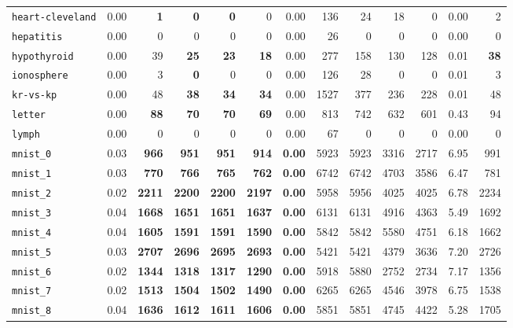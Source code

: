 \begin{tabular}{lrrrrrrrrrrrr}
\texttt{heart-cleveland} & 0.00 & \textbf{1} & \textbf{0} & \textbf{0} & 0 & 0.00 & 136 & 24 & 18 & 0 & 0.00 & 2\\
\texttt{hepatitis} & 0.00 & 0 & 0 & 0 & 0 & 0.00 & 26 & 0 & 0 & 0 & 0.00 & 0\\
\texttt{hypothyroid} & 0.00 & 39 & \textbf{25} & \textbf{23} & \textbf{18} & 0.00 & 277 & 158 & 130 & 128 & 0.01 & \textbf{38}\\
\texttt{ionosphere} & 0.00 & 3 & \textbf{0} & 0 & 0 & 0.00 & 126 & 28 & 0 & 0 & 0.01 & 3\\
\texttt{kr-vs-kp} & 0.00 & 48 & \textbf{38} & \textbf{34} & \textbf{34} & 0.00 & 1527 & 377 & 236 & 228 & 0.01 & 48\\
\texttt{letter} & 0.00 & \textbf{88} & \textbf{70} & \textbf{70} & \textbf{69} & 0.00 & 813 & 742 & 632 & 601 & 0.43 & 94\\
\texttt{lymph} & 0.00 & 0 & 0 & 0 & 0 & 0.00 & 67 & 0 & 0 & 0 & 0.00 & 0\\
\texttt{mnist\_0} & 0.03 & \textbf{966} & \textbf{951} & \textbf{951} & \textbf{914} & \textbf{0.00} & 5923 & 5923 & 3316 & 2717 & 6.95 & 991\\
\texttt{mnist\_1} & 0.03 & \textbf{770} & \textbf{766} & \textbf{765} & \textbf{762} & \textbf{0.00} & 6742 & 6742 & 4703 & 3586 & 6.47 & 781\\
\texttt{mnist\_2} & 0.02 & \textbf{2211} & \textbf{2200} & \textbf{2200} & \textbf{2197} & \textbf{0.00} & 5958 & 5956 & 4025 & 4025 & 6.78 & 2234\\
\texttt{mnist\_3} & 0.04 & \textbf{1668} & \textbf{1651} & \textbf{1651} & \textbf{1637} & \textbf{0.00} & 6131 & 6131 & 4916 & 4363 & 5.49 & 1692\\
\texttt{mnist\_4} & 0.04 & \textbf{1605} & \textbf{1591} & \textbf{1591} & \textbf{1590} & \textbf{0.00} & 5842 & 5842 & 5580 & 4751 & 6.18 & 1662\\
\texttt{mnist\_5} & 0.03 & \textbf{2707} & \textbf{2696} & \textbf{2695} & \textbf{2693} & \textbf{0.00} & 5421 & 5421 & 4379 & 3636 & 7.20 & 2726\\
\texttt{mnist\_6} & 0.02 & \textbf{1344} & \textbf{1318} & \textbf{1317} & \textbf{1290} & \textbf{0.00} & 5918 & 5880 & 2752 & 2734 & 7.17 & 1356\\
\texttt{mnist\_7} & 0.02 & \textbf{1513} & \textbf{1504} & \textbf{1502} & \textbf{1490} & \textbf{0.00} & 6265 & 6265 & 4546 & 3978 & 6.75 & 1538\\
\texttt{mnist\_8} & 0.04 & \textbf{1636} & \textbf{1612} & \textbf{1611} & \textbf{1606} & \textbf{0.00} & 5851 & 5851 & 4745 & 4422 & 5.28 & 1705\\

\end{tabular}
